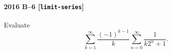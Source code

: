 \paragraph{2016 B--6 \textnormal{[\texttt{limit-series}]}}
Evaluate
\[
\sum_{k=1}^\infty \frac{(-1)^{k-1}}{k} \sum_{n=0}^\infty \frac{1}{k2^n + 1}.
\]
